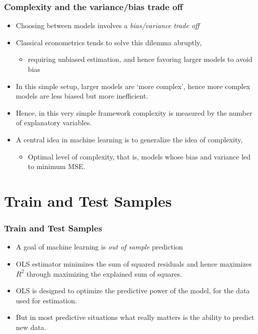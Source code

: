 \documentclass[
  shownotes,
  xcolor={svgnames},
  hyperref={colorlinks,citecolor=DarkBlue,linkcolor=DarkRed,urlcolor=DarkBlue}
  ]{beamer}
\begin{document}
\begin{frame}
\frametitle{Complexity and the variance/bias trade off}


\begin{itemize}
  \item Choosing between models involves a {\it bias/variance trade off}
  \medskip
\item Classical econometrics tends to solve this dilemma abruptly, 
  \begin{itemize}
    \item  requiring unbiased estimation, and hence favoring larger models to avoid bias
  \end{itemize}
\medskip
\item In this simple setup, larger models are `more complex', hence more complex models are less biased but more inefficient. 
\medskip
\item Hence, in this very simple framework complexity is measured by the number of explanatory variables. 
\medskip
\item A central idea in machine learning is to generalize the idea of complexity, 
  \begin{itemize}
    \item Optimal level of complexity, that is, models whose bias and variance led to minimum MSE.
  \end{itemize}
\end{itemize}

\end{frame}

\section{Train and Test Samples}
\begin{frame}
\frametitle{Train and Test Samples}

\begin{itemize}
  \item A  goal of machine learning is \emph{out of sample} prediction
  \bigskip
  \item OLS estimator minimizes the sum of squared residuals and hence maximizes $R^2$ through maximizing the explained sum of squares. 
  \bigskip
  \item OLS is designed to optimize the predictive power of the model, for the data used for estimation. 
  \bigskip
  \item But in most predictive situations what really matters is the ability to predict new data.
  
  
\end{itemize}




\end{frame}
\end{document}
